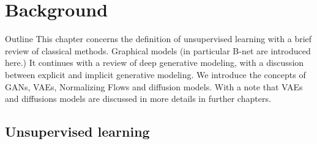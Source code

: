\chapter{Background}\label{ch:02}

\begin{remark}{Outline}
This chapter concerns the definition of unsupervised learning with a brief review of classical methods.
Graphical models (in particular B-net are introduced here.)
It continues with a review of deep generative modeling, with a discussion between explicit and implicit generative modeling.
We introduce the concepts of GANs, VAEs, Normalizing Flows and diffusion models. With a note that VAEs and diffusions models
are discussed in more details in further chapters.
\end{remark}

\section{Unsupervised learning}
\label{sec:2:Unsupervised learning}
